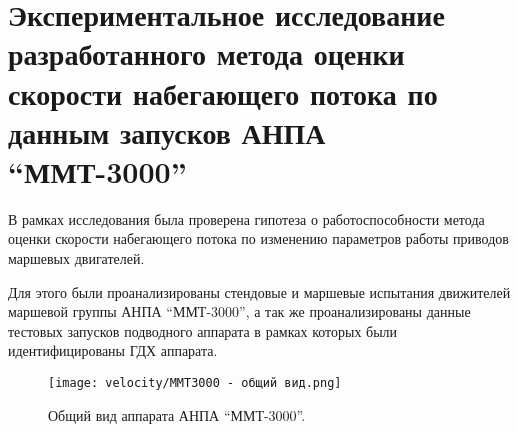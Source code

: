 






\section{Экспериментальное исследование разработанного метода оценки скорости набегающего потока по данным запусков АНПА ``ММТ-3000''}
В рамках исследования была проверена гипотеза о работоспособности метода оценки скорости набегающего потока по изменению параметров работы приводов маршевых двигателей.

Для этого были проанализированы стендовые и маршевые испытания движителей маршевой группы АНПА ``ММТ-3000'', а так же проанализированы данные тестовых запусков подводного аппарата в рамках которых были идентифицированы ГДХ аппарата.

\begin{figure}[ht]
    \centering
    \texttt{[image: velocity/MMT3000 - общий вид.png]}
    \caption{Общий вид аппарата АНПА ``ММТ-3000''.}
    \label{fig:mmt-3000}
\end{figure}

